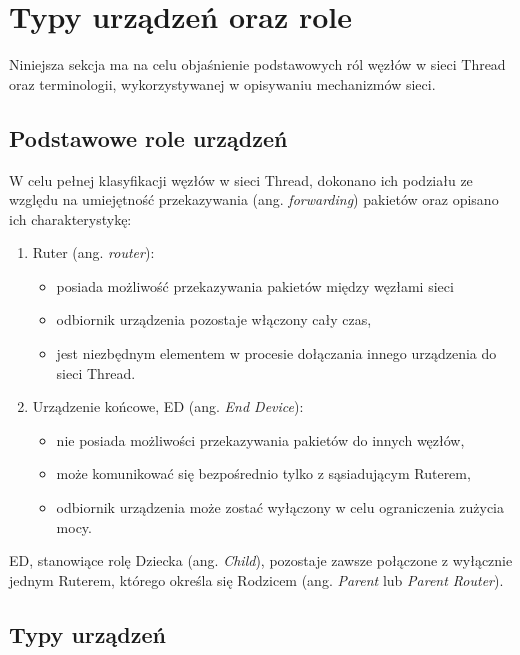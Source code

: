 \section{Typy urządzeń oraz role}

    Niniejsza sekcja ma na celu objaśnienie podstawowych ról węzłów w sieci Thread oraz terminologii, wykorzystywanej w opisywaniu mechanizmów sieci.

    \subsection{Podstawowe role urządzeń}

    W celu pełnej klasyfikacji węzłów w sieci Thread, dokonano ich podziału ze względu na umiejętność przekazywania (ang. \textit{forwarding}) pakietów oraz opisano ich charakterystykę:
    \begin{enumerate}
        \item Ruter (ang. \textit{router}):
        \begin{itemize}
            \item posiada możliwość przekazywania pakietów między węzłami sieci
            \item odbiornik urządzenia pozostaje włączony cały czas,
            \item jest niezbędnym elementem w procesie dołączania innego urządzenia do sieci Thread.
        \end{itemize}
        \item Urządzenie końcowe, ED (ang. \textit{End Device}):
        \begin{itemize}
            \item nie posiada możliwości przekazywania pakietów do innych węzłów,
            \item może komunikować się bezpośrednio tylko z sąsiadującym Ruterem,
            \item odbiornik urządzenia może zostać wyłączony w celu ograniczenia zużycia mocy.
        \end{itemize}
    \end{enumerate}

    ED, stanowiące rolę Dziecka (ang. \textit{Child}), pozostaje zawsze połączone z wyłącznie jednym Ruterem, którego określa się Rodzicem (ang. \textit{Parent} lub \textit{Parent Router}).

    \subsection{Typy urządzeń}

